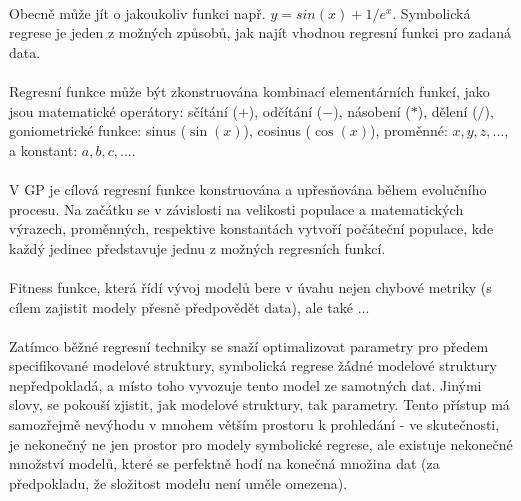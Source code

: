 \documentclass[bc,male,java,dept460]{diploma}		%
\begin{document}
\paragraph*{}
Obecně může jít o jakoukoliv funkci např. $y=sin(x)+1/e^x$. Symbolická regrese je jeden z možných způsobů, jak najít vhodnou regresní funkci pro zadaná data.

\paragraph*{}
Regresní funkce může být zkonstruována kombinací elementárních funkcí, jako jsou matematické operátory: sčítání ($+$), odčítání ($-$), násobení ($*$), dělení ($/$), goniometrické funkce: sinus ($\sin(x)$), cosinus ($\cos(x)$), proměnné:  $x, y, z, ...$, a konstant: $a, b, c, ...$. 

\paragraph*{}
V GP je cílová regresní funkce konstruována a upřesňována během evolučního procesu. Na začátku se v závislosti na velikosti populace a matematických výrazech, proměnných, respektive konstantách vytvoří počáteční populace, kde každý jedinec představuje jednu z možných regresních funkcí.

\paragraph*{}
Fitness funkce, která řídí vývoj modelů bere v úvahu nejen chybové metriky (s cílem zajistit modely přesně předpovědět data), ale také ...

\paragraph*{}
Zatímco běžné regresní techniky se snaží optimalizovat parametry pro předem specifikované modelové struktury, symbolická regrese žádné modelové struktury nepředpokladá, a místo toho vyvozuje tento model ze samotných dat. Jinými slovy, se pokouší zjistit, jak modelové struktury, tak parametry. Tento přístup má samozřejmě nevýhodu v mnohem větším prostoru k prohledání - ve skutečnosti, je nekonečný ne jen prostor pro modely symbolické regrese, ale existuje nekonečné množství modelů, které se perfektně hodí na konečná množina dat (za předpokladu, že složitost modelu není uměle omezena). 

\end{document}
